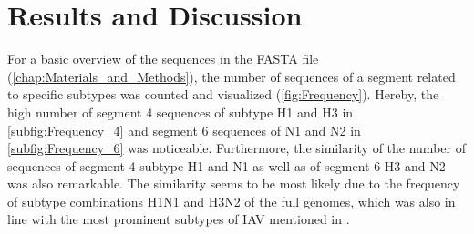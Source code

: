 \chapter{Results and Discussion} \label{chap:Results_and_Discussion}

For a basic overview of the sequences in the FASTA file (\autoref{chap:Materials_and_Methods}), the number of sequences of a segment related to specific subtypes was counted and visualized (\autoref{fig:Frequency}). Hereby, the high number of segment 4 sequences of subtype H1 and H3 in \autoref{subfig:Frequency_4} and segment 6 sequences of N1 and N2 in \autoref{subfig:Frequency_6} was noticeable. Furthermore, the similarity of the number of sequences of segment 4 subtype H1 and N1 as well as of segment 6 H3 and N2 was also remarkable. The similarity seems to be most likely due to the frequency of subtype combinations H1N1 and H3N2 of the full genomes, which was also in line with the most prominent subtypes of \gls{IAV} mentioned in \textcite{deng_simplified_2015}. 

